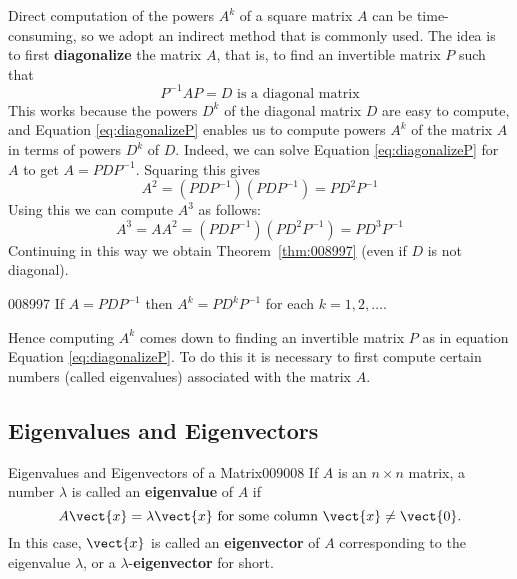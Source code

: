Direct computation of the powers $A^{k}$ of a square matrix $A$ can be time-consuming, so we adopt an indirect method that is commonly used. The idea is to first \textbf{diagonalize} the matrix $A$, that is, to find an invertible matrix $P$ such that
\begin{equation}\label{eq:diagonalizeP}
P^{-1}AP=D \mbox{ is a diagonal matrix}
\end{equation}
This works because the powers $D^{k}$ of the diagonal matrix $D$ are easy to compute, and Equation \ref{eq:diagonalizeP} enables us to compute powers $A^{k}$ of the matrix $A$ in terms of powers $D^{k}$ of $D$. Indeed, we can solve Equation \ref{eq:diagonalizeP} for $A$ to get $A = PDP^{-1}$. Squaring this gives
\begin{equation*}
A^2 = (PDP^{-1})(PDP^{-1}) = PD^2P^{-1}
\end{equation*}
Using this we can compute $A^{3}$ as follows:
\begin{equation*}
A^3 = AA^2 = (PDP^{-1})(PD^2P^{-1}) = PD^3P^{-1}
\end{equation*}
Continuing in this way we obtain Theorem~\ref{thm:008997} (even if $D$ is not diagonal).


\begin{theorem}{}{008997}
If $A = PDP^{-1}$ then $A^{k} = PD^{k}P^{-1}$ for each $k = 1, 2, \dots$.
\end{theorem}

Hence computing $A^{k}$ comes down to finding an invertible matrix $P$ as in equation Equation \ref{eq:diagonalizeP}. To do this it is necessary to first compute certain numbers (called eigenvalues) associated with the matrix $A$.


\subsection*{Eigenvalues and Eigenvectors}


\begin{definition}{Eigenvalues and Eigenvectors of a Matrix}{009008}
If $A$ is an $n \times n$ matrix, a number $\lambda$ is called an \textbf{eigenvalue} of $A$ if
\begin{equation*}
A\vect{x} = \lambda \vect{x} \mbox{ for some column } \vect{x} \neq \vect{0}. 
\end{equation*}
In this case, $\vect{x}$ is called an \textbf{eigenvector} of $A$ corresponding to the eigenvalue $\lambda$, or a $\lambda$-\textbf{eigenvector} for short.
\end{definition}


